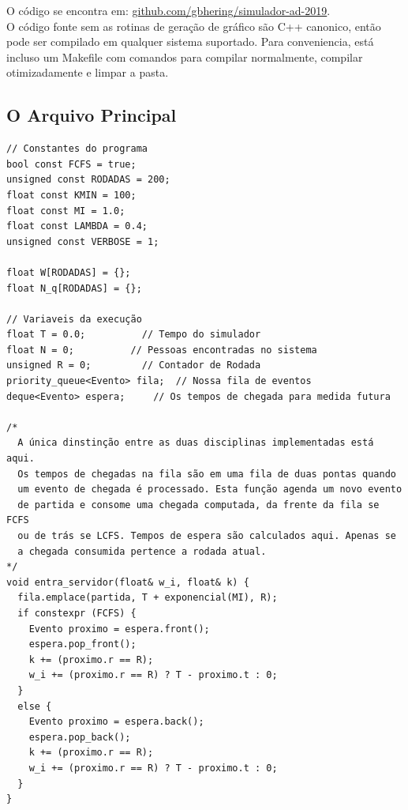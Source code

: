 \documentclass{article}
\begin{document}
O código se encontra em: \url{github.com/gbhering/simulador-ad-2019}. \\

O código fonte sem as rotinas de geração de gráfico são C++ canonico, então pode ser compilado em qualquer sistema suportado. Para conveniencia, está incluso um Makefile com comandos para compilar normalmente, compilar otimizadamente e limpar a pasta.

\subsection{O Arquivo Principal}
\begin{verbatim}
// Constantes do programa
bool const FCFS = true;
unsigned const RODADAS = 200;
float const KMIN = 100;
float const MI = 1.0;
float const LAMBDA = 0.4;
unsigned const VERBOSE = 1;

float W[RODADAS] = {};
float N_q[RODADAS] = {};

// Variaveis da execução
float T = 0.0;          // Tempo do simulador
float N = 0;          // Pessoas encontradas no sistema 
unsigned R = 0;         // Contador de Rodada
priority_queue<Evento> fila;  // Nossa fila de eventos
deque<Evento> espera;     // Os tempos de chegada para medida futura

/* 
  A única dinstinção entre as duas disciplinas implementadas está aqui.
  Os tempos de chegadas na fila são em uma fila de duas pontas quando
  um evento de chegada é processado. Esta função agenda um novo evento
  de partida e consome uma chegada computada, da frente da fila se FCFS
  ou de trás se LCFS. Tempos de espera são calculados aqui. Apenas se
  a chegada consumida pertence a rodada atual.
*/
void entra_servidor(float& w_i, float& k) {
  fila.emplace(partida, T + exponencial(MI), R);
  if constexpr (FCFS) {
    Evento proximo = espera.front();
    espera.pop_front();
    k += (proximo.r == R);
    w_i += (proximo.r == R) ? T - proximo.t : 0;
  }
  else {
    Evento proximo = espera.back();
    espera.pop_back();
    k += (proximo.r == R);
    w_i += (proximo.r == R) ? T - proximo.t : 0;
  }
}


\end{verbatim}
\end{document}
